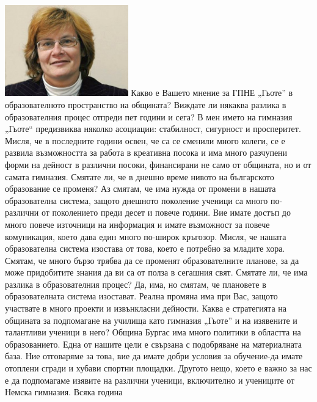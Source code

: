 \begin{multicols}{3}

\noindent \includegraphics[width=2.1in]{./Ananieva/5.jpg}
Какво е Вашето мнение за ГПНЕ „Гьоте” в образователното пространство на 
общината? Виждате ли някаква разлика в образователния процес отпреди пет години 
и сега?
В мен името на гимназия „Гьоте“ предизвиква няколко асоциации: стабилност, 
сигурност и просперитет. Мисля, че в последните години освен, че са се сменили 
много колеги, се е развила възможността за работа в креативна посока и има много 
разчупени форми на дейност в различни посоки, финансирани не само от общината, 
но и от самата гимназия.
Смятате ли, че в днешно време нивото на българското образование се променя?
Аз смятам, че има нужда от  промени в нашата образователна система, защото 
днешното поколение ученици са много по-различни от поколението преди десет и 
повече години. Вие имате достъп до много повече източници на информация и имате 
възможност за повече комуникация, което дава един много по-широк кръгозор. 
Мисля, че нашата образователна система изостава от това, което е потребно за 
младите хора. Смятам, че много бързо трябва да се променят образователните 
планове, за да може придобитите знания да ви са от полза в сегашния свят.
Смятате ли, че има разлика в образователния процес?
Да, има, но смятам, че плановете в образователната система изостават. Реална 
промяна има при Вас, защото участвате в много проекти и извънкласни дейности.
Каква е стратегията на общината за подпомагане на училища като гимназия „Гьоте” 
и на изявените и талантливи ученици в него?
Община Бургас има много политики в областта на образованието. Една от нашите 
цели е свързана с подобряване на материалната база. Ние отговаряме за това, вие 
да имате добри условия за обучение-да имате отоплени сгради и хубави спортни 
площадки. Другото нещо, което е важно за нас е да подпомагаме изявите на 
различни ученици, включително и учениците от Немска гимназия. Всяка година 

\end{multicols}
